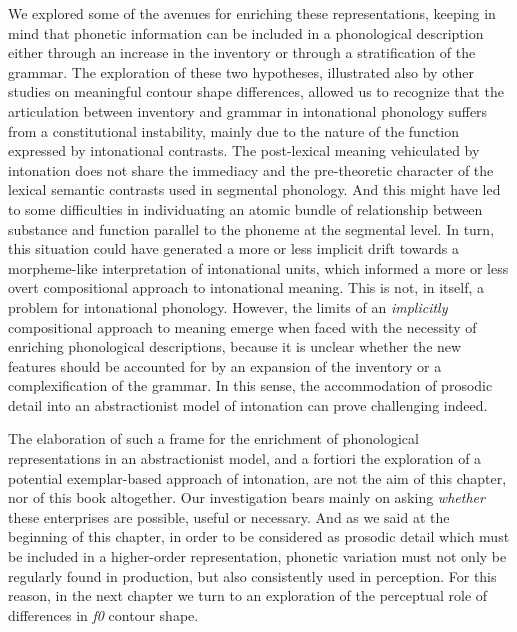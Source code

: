 We explored some of the avenues for enriching these representations, keeping in mind that phonetic information can be included in a phonological description either through an increase in the inventory or through a stratification of the grammar. The exploration of these two hypotheses, illustrated also by other studies on meaningful contour shape differences, allowed us to recognize that the articulation between inventory and grammar in intonational phonology suffers from a constitutional instability, mainly due to the nature of the function expressed by intonational contrasts. The post-lexical meaning vehiculated by intonation does not share the immediacy and the pre-theoretic character of the lexical semantic contrasts used in segmental phonology. And this might have led to some difficulties in individuating an atomic bundle of relationship between substance and function parallel to the phoneme at the segmental level. In turn, this situation could have generated a more or less implicit drift towards a morpheme-like interpretation of intonational units, which informed a more or less overt compositional approach to intonational meaning. This is not, in itself, a problem for intonational phonology. However, the limits of an \textit{implicitly} compositional approach to meaning emerge when faced with the necessity of enriching phonological descriptions, because it is unclear whether the new features should be accounted for by an expansion of the inventory or a complexification of the grammar. In this sense, the accommodation of prosodic detail into an abstractionist model of intonation can prove challenging indeed. 

The elaboration of such a frame for the enrichment of phonological representations in an abstractionist model, and a fortiori the exploration of a potential exemplar-based approach of intonation, are not the aim of this chapter, nor of this book altogether. Our investigation bears mainly on asking \textit{whether} these enterprises are possible, useful or necessary. And as we said at the beginning of this chapter, in order to be considered as prosodic detail which must be included in a higher-order representation, phonetic variation must not only be regularly found in production, but also consistently used in perception. For this reason, in the next chapter we turn to an exploration of the perceptual role of differences in \textit{f0} contour shape.
